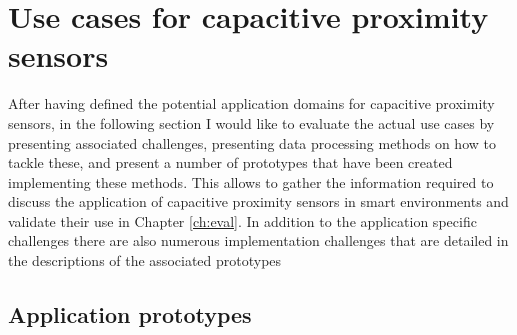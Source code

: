 \chapter{Use cases for capacitive proximity sensors}
\label{ch:proto}
After having defined the potential application domains for capacitive proximity sensors, in the following section I would like to evaluate the actual use cases by presenting associated challenges, presenting data processing methods on how to tackle these, and present a number of prototypes that have been created implementing these methods. This allows to gather the information required to discuss the application of capacitive proximity sensors in smart environments and validate their use in Chapter \ref{ch:eval}. In addition to the application specific challenges there are also numerous implementation challenges that are detailed in the descriptions of the associated prototypes


\section{Application prototypes}

\clearpage

\clearpage

\clearpage

\clearpage

\clearpage

\clearpage
